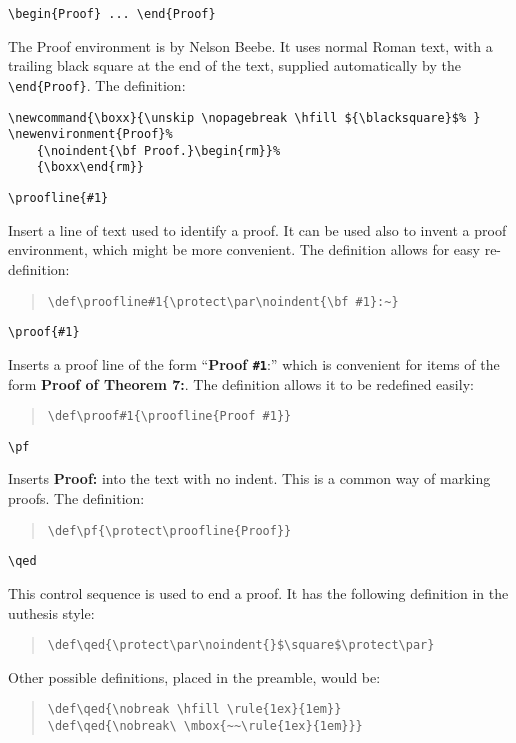 \medskip

\verb|\begin{Proof} ... \end{Proof}|

\noindent The  Proof environment is by Nelson Beebe.
It uses normal Roman text, with a trailing
black square at the end of the text, supplied automatically
by the \verb|\end{Proof}|. The definition:

\begin{verbatim}
\newcommand{\boxx}{\unskip \nopagebreak \hfill ${\blacksquare}$% }
\newenvironment{Proof}%
    {\noindent{\bf Proof.}\begin{rm}}%
    {\boxx\end{rm}}
\end{verbatim}

\verb|\proofline{#1}|

\noindent Insert a line of text used to identify a proof. It can be used
also to invent a proof environment, which might be more convenient. The
definition allows for easy re-definition:

\begin{quote}
\verb|\def\proofline#1{\protect\par\noindent{\bf #1}:~}|
\end{quote}

\medskip

\verb|\proof{#1}|

\noindent Inserts a proof line of the form ``{\bf Proof \verb|#1|}:''
which is convenient for items of the form {\bf Proof of Theorem 7:}. The
definition allows it to be redefined easily:

\begin{quote}
\verb|\def\proof#1{\proofline{Proof #1}}|
\end{quote}

\medskip

\verb|\pf|

\noindent Inserts {\bf Proof:} into the text with no indent. This is a
common way of marking proofs. The definition:

\begin{quote}
\verb|\def\pf{\protect\proofline{Proof}}|
\end{quote}

\medskip

\verb|\qed|

\noindent This control sequence is used to end a proof. It has the following
definition in the uuthesis style:
\begin{quote}
\verb|\def\qed{\protect\par\noindent{}$\square$\protect\par}|
\end{quote}
Other possible definitions, placed in the preamble, would be:
\begin{quote}
\verb|\def\qed{\nobreak \hfill \rule{1ex}{1em}}|\\
\verb|\def\qed{\nobreak\ \mbox{~~\rule{1ex}{1em}}}|
\end{quote}

